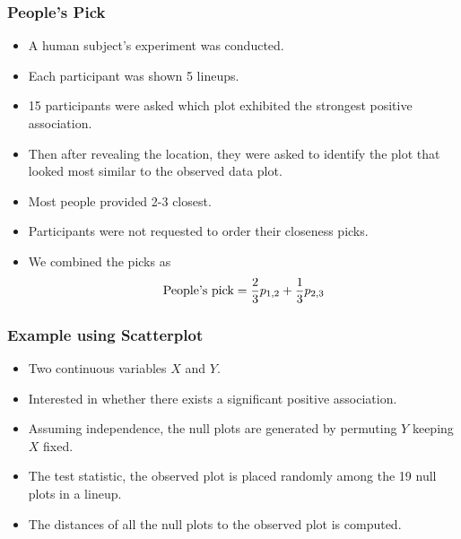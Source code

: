 \documentclass{beamer}
\begin{document}
\begin{frame}
\frametitle{People's Pick}
\begin{itemize}
\item A human subject's experiment was conducted.
\item Each participant was shown 5 lineups.
\item 15 participants were asked which plot exhibited the strongest positive association.
\item Then after revealing the location, they were asked to identify the plot that looked most similar to the observed data plot.
\item Most people provided 2-3 closest.
\item Participants were not requested to order their closeness picks. 
\item We combined the picks as 
\[
\hbox{People's pick} = \frac{2}{3} p_{1,2} + \frac{1}{3} p_{2,3}
\]
\end{itemize}
\end{frame}


\begin{frame}
\frametitle{Example using Scatterplot}
\begin{itemize}
\item Two continuous variables $X$ and $Y$.
\item Interested in whether there exists a significant positive association.
\item Assuming independence, the null plots are generated by permuting $Y$ keeping $X$ fixed.
\item The test statistic, the observed plot is placed randomly among the 19 null plots in a lineup.
\item The distances of all the null plots to the observed plot is computed.
\end{itemize}

\end{frame}
\end{document}
